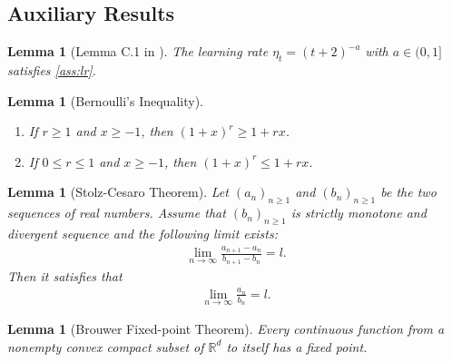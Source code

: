 \documentclass{article} %
\theoremstyle{plain}
\newtheorem{lemma}[theorem]{Lemma}
\theoremstyle{definition}
\theoremstyle{remark}
\newcommand{\R}{\mathbb{R}}
\begin{document}
\subsection{Auxiliary Results}
\begin{lemma}[Lemma C.1 in \citet{zhang2024the}]
    The learning rate $\eta_t=(t+2)^{-a}$ with $a \in (0, 1]$ satisfies \cref{ass:lr}.
\end{lemma}

\begin{lemma}[Bernoulli's Inequality] \label{lemma:bernoulli}
    \begin{enumerate}[label=(\alph*)]
        \item If $r \geq 1$ and $x \geq -1$, then $(1+x)^r \geq 1 + rx$.
        \item If $0 \leq r \leq 1$ and $x \geq -1$, then $(1+x)^r \leq 1 + rx$.
    \end{enumerate}
    
\end{lemma}

\begin{lemma}[Stolz-Cesaro Theorem]
    Let $(a_n)_{n\geq1}$ and $(b_n)_{n \geq 1}$ be the two sequences of real numbers. Assume that $(b_n)_{n \geq 1}$ is strictly monotone and divergent sequence and the following limit exists:
    \begin{align*}
        \lim_{n \rightarrow \infty} \frac{a_{n+1}-a_n}{b_{n+1}-b_n}=l.
    \end{align*}
    Then it satisfies that
    \begin{align*}
        \lim_{n \rightarrow \infty} \frac{a_n}{b_n}=l.
    \end{align*}
\end{lemma}

\begin{lemma}[Brouwer Fixed-point Theorem]
    Every continuous function from a nonempty convex compact subset of $\R^d$ to itself has a fixed point.
\end{lemma}
\end{document}
